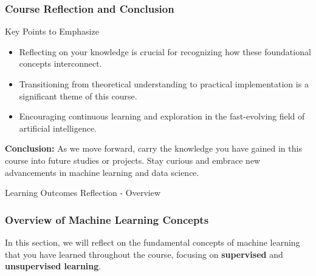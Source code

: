 \documentclass[aspectratio=169]{beamer}
\begin{document}
\begin{frame}[fragile]
    \frametitle{Course Reflection and Conclusion}
    \begin{block}{Key Points to Emphasize}
        \begin{itemize}
            \item Reflecting on your knowledge is crucial for recognizing how these foundational concepts interconnect.
            \item Transitioning from theoretical understanding to practical implementation is a significant theme of this course.
            \item Encouraging continuous learning and exploration in the fast-evolving field of artificial intelligence.
        \end{itemize}
    \end{block}
    
    \textbf{Conclusion:} As we move forward, carry the knowledge you have gained in this course into future studies or projects. Stay curious and embrace new advancements in machine learning and data science.
\end{frame}

\begin{frame}[fragile]{Learning Outcomes Reflection - Overview}
    \frametitle{Overview of Machine Learning Concepts}
    In this section, we will reflect on the fundamental concepts of machine learning that you have learned throughout the course, focusing on \textbf{supervised} and \textbf{unsupervised learning}.
\end{frame}
\end{document}
